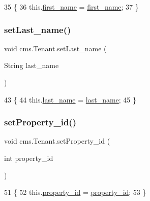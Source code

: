 \begin{DoxyCode}
35                                                  \{
36         this.\mbox{\hyperlink{classcms_1_1_tenant_adba73a34c1f9da8843218c5eb247bf65}{first\_name}} = \mbox{\hyperlink{classcms_1_1_tenant_adba73a34c1f9da8843218c5eb247bf65}{first\_name}};
37     \}
\end{DoxyCode}
\mbox{\label{classcms_1_1_tenant_ae0280b9a9edb5aceff758916b5239c6a}} 
\subsubsection{\texorpdfstring{set\+Last\+\_\+name()}{setLast\_name()}}
{\footnotesize\ttfamily void cms.\+Tenant.\+set\+Last\+\_\+name (\begin{DoxyParamCaption}\item[{String}]{last\+\_\+name }\end{DoxyParamCaption})\hspace{0.3cm}{\ttfamily [inline]}}


\begin{DoxyCode}
43                                                \{
44         this.\mbox{\hyperlink{classcms_1_1_tenant_a1f1a39984c6ad7060da79bd6a3ab91ef}{last\_name}} = \mbox{\hyperlink{classcms_1_1_tenant_a1f1a39984c6ad7060da79bd6a3ab91ef}{last\_name}};
45     \}
\end{DoxyCode}
\mbox{\label{classcms_1_1_tenant_ac82f6fd8f7c8537b10b1b6b4a96b5c43}} 
\subsubsection{\texorpdfstring{set\+Property\+\_\+id()}{setProperty\_id()}}
{\footnotesize\ttfamily void cms.\+Tenant.\+set\+Property\+\_\+id (\begin{DoxyParamCaption}\item[{int}]{property\+\_\+id }\end{DoxyParamCaption})\hspace{0.3cm}{\ttfamily [inline]}}


\begin{DoxyCode}
51                                                 \{
52         this.\mbox{\hyperlink{classcms_1_1_tenant_a4954483dd78e87b6b4d5e5dac444971e}{property\_id}} = \mbox{\hyperlink{classcms_1_1_tenant_a4954483dd78e87b6b4d5e5dac444971e}{property\_id}};
53     \}
\end{DoxyCode}
\mbox{\label{classcms_1_1_tenant_ad701e450f795e42cc270b1fd493ac01f}} 

